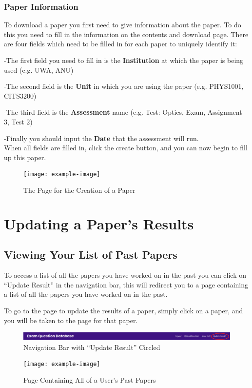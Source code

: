 \documentclass[12pt, a4paper, titlepage]{book}
\begin{document}
\subsection{Paper Information}
To download a paper you first need to give information about the paper. To do this you need to fill in the information on the contents and download page. 	There are four fields which need to be filled in for each paper to uniquely identify it:
\small
\par -The first field you need to fill in is the \textbf{Institution }at which the paper is being used (e.g. UWA, ANU)
\par -The second field is the \textbf{Unit} in which you are using the paper (e.g. PHYS1001, CITS3200)
\par -The third field is the \textbf{Assessment} name (e.g. Test: Optics, Exam, Assignment 3, Test 2)
\par -Finally you should input the \textbf{Date} that the assessment will run.
\normalsize
\\ When all fields are filled in, click the create button, and you can now begin to fill up this paper.
\begin{figure}[htp]
\centering
\texttt{[image: example-image]}
\caption{The Page for the Creation of a Paper}
\end{figure}



\chapter{Updating a Paper's Results}\label{ch:upres}
\section{Viewing Your List of Past Papers}
To access a list of all the papers you have worked on in the past you can click on ``Update Result'' in the navigation bar, this will redirect you to a page containing a list of all the papers you have worked on in the past.\par To go to the page to update the results of a paper, simply click on a paper, and you will be taken to the page for that paper.
\begin{figure}[htp]
\centering
\includegraphics[width =16cm]{NavBarPapRes}
\caption{Navigation Bar with ``Update Result'' Circled}
\end{figure}
\begin{figure}[H]
\centering
\texttt{[image: example-image]}
\caption{Page Containing All of a User's Past Papers}
\end{figure}
\end{document}
